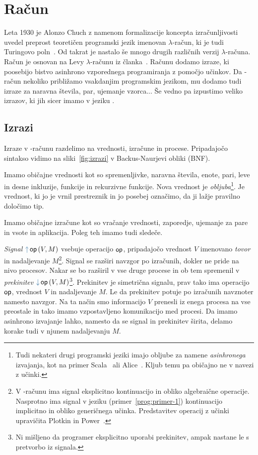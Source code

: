 \section{Račun \lae{}}\label{sec:lae}

Leta 1930 je Alonzo Chuch z namenom formalizacije koncepta izračunljivosti uvedel preprost teoretičen programski jezik imenovan $\lambda$-račun, ki je tudi Turingovo poln~\cite{rojas2015tutorial}.
Od takrat je nastalo še mnogo drugih različnih verzij $\lambda$-računa.
Račun \lae{} je osnovan na Levy $\lambda$-računu iz članka~\cite{levy}. Računu \lae{} dodamo izraze, ki poosebijo bistvo asinhrono vzporednega programiranja z pomočjo učinkov. Da \lae{}-račun nekoliko približamo vsakdanjim programskim jezikom, mu dodamo tudi izraze za  naravna števila, par, ujemanje vzorca... Še vedno pa izpustimo veliko izrazov, ki jih sicer imamo v jeziku \aeff{}.


\subsection{Izrazi}

Izraze v \lae{}-računu razdelimo na vrednosti, izračune in procese. Pripadajočo sintakso vidimo na sliki~\ref{fig:izrazi} v Backus-Naurjevi obliki (BNF).

Imamo običajne vrednosti kot so spremenljivke, naravna števila, enote, pari, leve in desne inkluzije, funkcije in rekurzivne funkcije.
Nova vrednost je \emph{obljuba}\footnote{Tudi nekateri drugi programski jeziki imajo obljube za namene \emph{asinhronega} izvajanja, kot na primer Scala~\cite{scala} ali Alice~\cite{lambdapf}. Kljub temu pa običajno ne v navezi z učinki.}. Je vrednost, ki jo je vrnil prestreznik in jo posebej označimo, da ji lažje pravilno določimo tip.

Imamo običajne izračune kot so vračanje vrednosti, zaporedje, ujemanje za pare in vsote in aplikacija.
Poleg teh imamo tudi sledeče.

\emph{Signal} $\tmopout{op}{V}{M}$ vsebuje operacijo $\mathsf{op}$, pripadajočo vrednost $V$ imenovano \emph{tovor} in nadaljevanje $M$\footnote{V \lae{}-računu ima signal eksplicitno kontinuacijo in obliko algebraične operacije. Nasprotno ima signal v jeziku \aeff{} (primer~\ref{prog:primer-1}) kontinuacijo implicitno in obliko generičnega učinka. Predstavitev operacij z učinki upravičita Plotkin in Power~\cite{op-eff}.}. Signal se razširi navzgor po izračunih, dokler ne pride na nivo procesov. Nakar se bo razširil v vse druge procese in ob tem spremenil v \emph{prekinitev} $\tmopin{op}{V}{M}$\footnote{Ni mišljeno da programer eksplicitno uporabi prekinitev, ampak nastane le s pretvorbo iz signala.}. Prekinitev je simetrična signalu, prav tako ima operacijo $\mathsf{op}$, vrednost $V$ in nadaljevanje $M$. Le da prekinitev potuje po izračunih navznoter namesto navzgor. Na ta način smo informacijo $V$ prenesli iz enega procesa na vse preostale in tako imamo vzpostavljeno komunikacijo med procesi. Da imamo asinhrono izvajanje lahko, namesto da se signal in prekinitev širita, delamo korake tudi v njunem nadaljevanju $M$.

